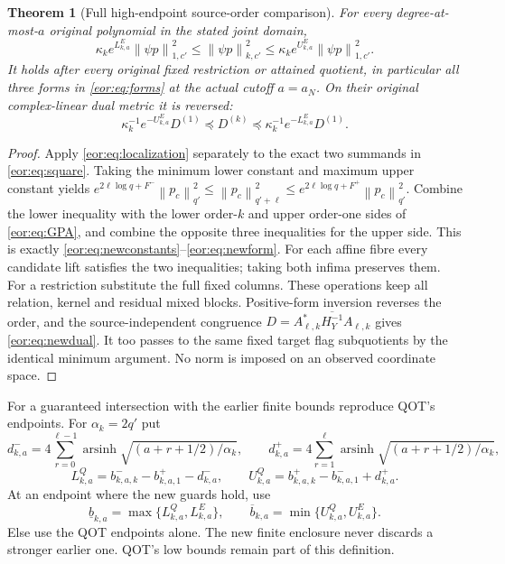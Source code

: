 \documentclass[11pt,a4paper]{article}
\newtheorem{theorem}{Theorem}[section]
\DeclareMathOperator{\arsinh}{arsinh}
\newcommand{\norm}[1]{\left\lVert#1\right\rVert}
\begin{document}
\begin{theorem}[Full high-endpoint source-order comparison]
For every degree-at-most-$a$ original polynomial in the stated joint domain,
\begin{equation}
 \kappa_k e^{L_{k,a}^{E}}\norm{\psi p}_{1,c'}^2
 \le \norm{\psi p}_{k,c'}^2
 \le\kappa_k e^{U_{k,a}^{E}}\norm{\psi p}_{1,c'}^2.
 \label{eor:eq:newform}
\end{equation}
It holds after every original fixed restriction or attained quotient, in
particular all three forms in \eqref{eor:eq:forms} at the actual cutoff $a=a_N$.
On their original complex-linear dual metric it is reversed:
\begin{equation}
 \kappa_k^{-1}e^{-U_{k,a}^{E}}D^{(1)}
 \preceq D^{(k)}\preceq
 \kappa_k^{-1}e^{-L_{k,a}^{E}}D^{(1)}.
 \label{eor:eq:newdual}
\end{equation}
\end{theorem}
\begin{proof}
Apply \eqref{eor:eq:localization} separately to the exact two summands in
\eqref{eor:eq:square}. Taking the minimum lower constant and maximum upper constant
yields
$e^{2\ell\log q+F^-}\norm{p_c}_{q'}^2
\le\norm{p_c}_{q'+\ell}^2
\le e^{2\ell\log q+F^+}\norm{p_c}_{q'}^2$.
Combine the lower inequality with the lower order-$k$ and upper order-one sides
of \eqref{eor:eq:GPA}, and combine the opposite three inequalities for the upper side.
This is exactly \eqref{eor:eq:newconstants}--\eqref{eor:eq:newform}.
For each affine fibre every candidate lift satisfies the two inequalities;
taking both infima preserves them. For a restriction substitute the full fixed
columns. These operations keep all relation, kernel and residual mixed blocks.
Positive-form inversion reverses the order, and the source-independent congruence
$D=A_{\ell,k}^*\overline{H_Y^{-1}}A_{\ell,k}$ gives \eqref{eor:eq:newdual}.
It too passes to the same fixed target flag subquotients by the identical
minimum argument. No norm is imposed on an observed coordinate space.
\end{proof}

For a guaranteed intersection with the earlier finite bounds reproduce QOT's
endpoints. For $\alpha_k=2q'$ put
\[
 d^-_{k,a}=4\sum_{r=0}^{\ell-1}\arsinh\sqrt{(a+r+1/2)/\alpha_k},\qquad
 d^+_{k,a}=4\sum_{r=1}^{\ell}\arsinh\sqrt{(a+r+1/2)/\alpha_k},
\]
\[
 L_{k,a}^{Q}=b^-_{k,a,k}-b^+_{k,a,1}-d^-_{k,a},\qquad
 U_{k,a}^{Q}=b^+_{k,a,k}-b^-_{k,a,1}+d^+_{k,a}.
\]
At an endpoint where the new guards hold, use
\begin{equation}
 \underline b_{k,a}=\max\{L_{k,a}^Q,L_{k,a}^E\},\qquad
 \overline b_{k,a}=\min\{U_{k,a}^Q,U_{k,a}^E\}.
 \label{eor:eq:intersection}
\end{equation}
Else use the QOT endpoints alone. The new finite enclosure never discards a
stronger earlier one. QOT's low bounds remain part of this definition.
\end{document}
